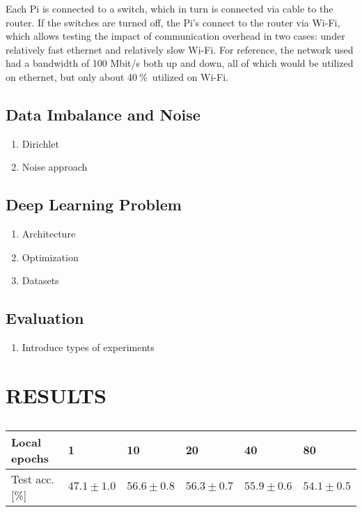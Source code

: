 \documentclass{article}
\newcommand{\unit}[1]{\ensuremath{\:\text{#1}}}
\newcommand{\pro}{\ensuremath{\unit{\%{}}}}
\begin{document}
Each Pi is connected to a switch, which in turn is connected via cable to the router.
If the switches are turned off, the Pi's connect to the router via Wi-Fi, which allows testing the impact of communication overhead in two cases: under relatively fast ethernet and relatively slow Wi-Fi.
For reference, the network used had a bandwidth of 100 Mbit/s both up and down, all of which would be utilized on ethernet, but only about 40\pro\ utilized on Wi-Fi.

\subsection{Data Imbalance and Noise}
\begin{enumerate}
    \item Dirichlet
    \item Noise approach
\end{enumerate}

\subsection{Deep Learning Problem}
\begin{enumerate}
    \item Architecture
    \item Optimization
    \item Datasets
\end{enumerate}

\subsection{Evaluation}
\begin{enumerate}
    \item Introduce types of experiments
\end{enumerate}

\section{RESULTS}%
\label{sec:results}

\begin{table}
        \footnotesize
        \begin{center}
                \begin{tabular}{l l l l l l}
                        Local epochs & 1 & 10 & 20 & 40 & 80 \\
                        \hline
                        Test acc. [\%] & $47.1 \pm 1.0$ & $56.6 \pm 0.8$ & $56.3 \pm 0.7$ & $55.9 \pm 0.6$ & $54.1 \pm 0.5$ \\
                \end{tabular}
        \end{center}
        \caption{}
        \label{tab:local_epochs}
\end{table}
\end{document}
